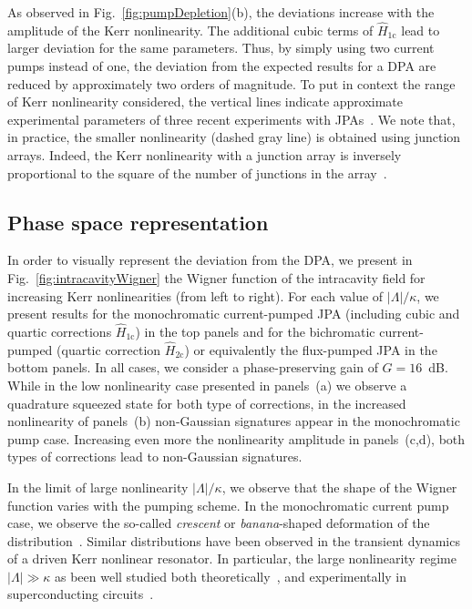 \documentclass[pra,twocolumn,superscriptaddress]{revtex4-1}
\newcommand{\corrSinglePump}[0]{\hat{H}_{\mathrm{1c}}}
\newcommand{\corrDoublePump}[0]{\hat{H}_{\mathrm{2c}}}
\newcommand{\abs}[1]{\left|#1\right|}
\begin{document}
As observed in Fig.~\ref{fig:pumpDepletion}(b), the deviations increase with the amplitude of the Kerr nonlinearity. The additional cubic terms of $\corrSinglePump$ lead to larger deviation for the same parameters. Thus, by simply using two current pumps instead of one, the deviation from the expected results for a DPA are reduced by approximately two orders of magnitude. To put in context the range of Kerr nonlinearity considered, the vertical lines indicate approximate experimental parameters of three recent experiments with JPAs~\cite{Eichler:2013kx,Hatridge:2011qf,Murch:2013kx}. 
% 
We note that, in practice, the smaller nonlinearity (dashed gray line) is obtained using junction arrays. Indeed, the Kerr nonlinearity with a junction array is inversely proportional to the square of the number of  junctions in the array~\cite{Castellanos-Beltran:2007ys,Eichler:2013fk}. 
 


\subsection{Phase space representation}
% 
In order to visually represent the deviation from the DPA, we present  in Fig.~\ref{fig:intracavityWigner} the Wigner function of the intracavity field for increasing Kerr nonlinearities (from left to right). 
% 
For each value of $\abs{\Lambda}/\kappa$, we present results for the monochromatic current-pumped JPA (including cubic and quartic corrections $\corrSinglePump$) in the top panels and for the bichromatic current-pumped (quartic correction $\corrDoublePump$) or equivalently the flux-pumped JPA  in the bottom panels. In all cases, we consider a phase-preserving gain of $G= 16$~dB.
% 
While in the low nonlinearity case presented in panels~(a) we observe a quadrature squeezed state for both type of corrections, in the increased nonlinearity of panels~(b) non-Gaussian signatures appear in the monochromatic pump case. Increasing even more the nonlinearity amplitude in panels~(c,d), both types of corrections lead to non-Gaussian signatures.

In the limit of large nonlinearity $\abs{\Lambda}/\kappa$, we observe that the shape of the Wigner function varies with the pumping scheme. 
In the monochromatic current pump case, we observe the so-called \textit{crescent} or \textit{banana}-shaped deformation of the distribution~\cite{dodonov2003theory}. Similar distributions have been observed in the transient dynamics of a driven Kerr nonlinear resonator.
% 
In particular, the large nonlinearity regime $|\Lambda| \gg \kappa$ as been well studied both theoretically~\cite{Wilson-Gordon:1991qq}, and experimentally in superconducting circuits~\cite{Kirchmair:2013pi}.
\end{document}

